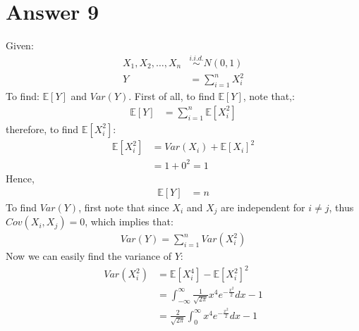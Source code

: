 \documentclass[a4paper]{article}
\begin{document}
\section{Answer 9}
Given:
\begin{equation*}
\begin{split}
	X_1,X_2,\dots,X_n &\overset{i.i.d.}{\sim} N\left( 0,1 \right) \\
Y &=  \sum_{i=1}^{n} X_i^2
\end{split}
\end{equation*}
To find: $\mathbb{E}\left[ Y \right] $ and $Var\left( Y \right) $.
\newline\newline
First of all, to find $\mathbb{E}\left[ Y \right] $, note that,:
\begin{equation*}
	\begin{split}
		\mathbb{E}\left[ Y \right] &= \sum_{i=1}^{n} \mathbb{E}\left[ X_i^2 \right] 
	\end{split}
\end{equation*}
therefore, to find $\mathbb{E}\left[ X_i^2 \right] $:
\begin{equation*}
	\begin{split}
		\mathbb{E}\left[ X_i^2 \right] &=  Var\left( X_i \right) + \mathbb{E}\left[ X_i \right] ^2\\
		&= 1 + 0^2 = 1
	\end{split}
\end{equation*}
Hence,
\begin{equation*}
	\begin{split}
		\mathbb{E}\left[ Y \right] &= n 
	\end{split}
\end{equation*}
 To find $Var\left( Y \right) $, first note that since $X_i$ and  $X_j$ are independent for  $i\neq j$, thus $Cov\left( X_i, X_j \right) = 0$, which implies that:
\begin{equation*}
	\begin{split}
		Var\left( Y \right) = \sum_{i=1}^{n} Var\left( X_i^2 \right) 
	\end{split}
\end{equation*}
Now we can easily find the variance of $Y$:
\begin{equation*}
	\begin{split}
		Var\left( X_i^2 \right)  &= \mathbb{E}\left[ X_i^4 \right] -\mathbb{E}\left[ X_i^2 \right] ^2\\
		&= \int_{-\infty}^{\infty} \frac{1}{\sqrt{2\pi} } x^{4}e^{-\frac{x^2}{2}} dx - 1\\
		&= \frac{2}{\sqrt{2\pi} } \int_0^{\infty} x^{4 }e^{-\frac{x^2}{2}} dx - 1
	\end{split}
\end{equation*}
\end{document}
